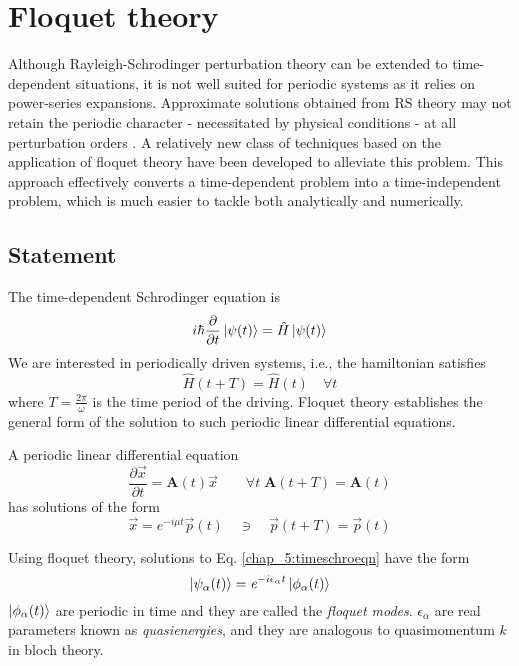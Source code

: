 %

\chapter{Floquet theory}\label{ch:fl}
Although Rayleigh-Schrodinger perturbation theory can be extended to time-dependent situations, it is not well suited for periodic systems as it relies on power-series
expansions. Approximate solutions obtained from RS theory may not retain the periodic character - necessitated by physical conditions - at all perturbation orders \cite{hanggi1998driven}.
A relatively new class of techniques based on the application of floquet theory have been developed to alleviate this problem. This approach effectively converts a time-dependent
problem into a time-independent problem, which is much easier to tackle both analytically and numerically.
\section{Statement}
The time-dependent Schrodinger equation is
\begin{equation}
  \label{chap_5:timeschroeqn}i\hbar\frac{\partial}{\partial t}\ket{\psi (t)} = \hat{H}\ket{\psi (t)}
\end{equation}We are interested in periodically driven systems, i.e., the hamiltonian satisfies
\begin{equation}
  \hat{H}(t+T) = \hat{H}(t) \quad \forall t
\end{equation} where $T = \frac{2\pi}{\omega}$ is the time period of the driving. Floquet theory establishes the general form of the solution 
to such periodic linear differential equations.
\newline
\begin{theorem} A periodic linear differential equation 
  \begin{equation*}
  \frac{\partial\vec{x}}{\partial t} = \mathbf{A}(t) \vec{x} \qquad \forall t \; \mathbf{A}(t+T) = \mathbf{A}(t)
  \end{equation*} has solutions of the form 
  \begin{equation*}
    \vec{x} = \mathit{e}^{-i \mu t} \vec{p}(t) \quad \ni \quad \vec{p}(t+T) = \vec{p}(t)
  \end{equation*}
\end{theorem}
Using floquet theory, solutions to Eq. \eqref{chap_5:timeschroeqn} have the form
\begin{equation}
 \label{chap_5:floquetstate}\ket{\psi_{\alpha}(t)} = \mathit{e}^{-i \epsilon_{\alpha} t} \ket{\phi_{\alpha}(t)}
\end{equation} $\ket{\phi_{\alpha}(t)}$ are periodic in time and they are called the \emph{floquet modes}. $\epsilon_{\alpha}$ are real parameters known as \emph{quasienergies}, 
and they are analogous to quasimomentum $k$ in bloch theory. 

